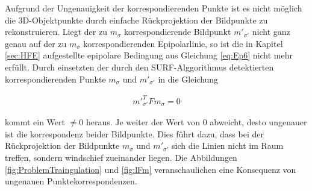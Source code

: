 Aufgrund der Ungenauigkeit der korrespondierenden Punkte ist es nicht möglich die 3D-Objektpunkte durch einfache Rückprojektion der Bildpunkte zu rekonstruieren. Liegt der zu $m_\sigma$ korrespondierende Bildpunkt $m'_{\sigma'}$ nicht ganz genau auf der zu $m_\sigma$ korrespondierenden Epipolarlinie, so ist die in Kapitel \ref{sec:HFE} aufgestellte epipolare Bedingung aus Gleichung \ref{eq:Ep6} nicht mehr erfüllt. Durch einsetzten der durch den SURF-Alggorithmus detektierten korrespondierenden Punkte $m_\sigma$ und $m'_{\sigma'}$ in die Gleichung 

\begin{gather}
	m'^T_{\sigma'}Fm_\sigma = 0
\end{gather}

kommt ein Wert $\neq 0$ heraus. Je weiter der Wert von 0 abweicht, desto ungenauer ist die korrespondenz beider Bildpunkte. Dies führt dazu, dass bei der Rückprojektion der Bildpunkte $m_\sigma$ und $m'_{\sigma'}$ sich die Linien nicht im Raum treffen, sondern windschief zueinander liegen. Die Abbildungen \ref{fig:ProblemTraingulation} und \ref{fig:lFm} veranschaulichen eine Konsequenz von ungenauen Punktekorrespondenzen.
%
%
%
%

